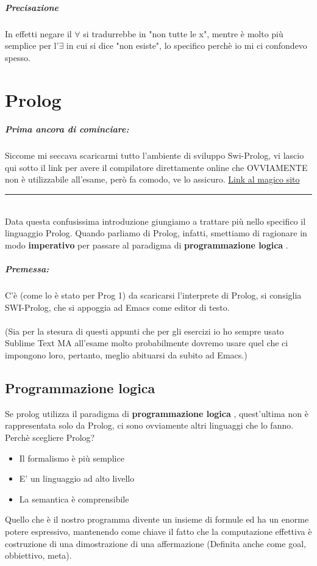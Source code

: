 \documentclass[12pt, a4paper, openany, oneside]{book}
\begin{document}
{\paragraph{Precisazione} In effetti negare il $\forall$ si tradurrebbe in 
"non tutte le x", mentre è molto più semplice per l'$\exists$ in cui si dice
"non esiste", lo specifico perchè io mi ci confondevo spesso.
\chapter{Prolog}
\paragraph{Prima ancora di cominciare: } Siccome mi seccava scaricarmi tutto 
l'ambiente di sviluppo Swi-Prolog, vi lascio qui sotto il link per avere il 
compilatore direttamente online che OVVIAMENTE non è utilizzabile all'esame, 
però fa comodo, ve lo assicuro. \href{https://swish.swi-prolog.org/}
{Link al magico sito}
\\
{\color{black} \rule{\linewidth}{0.3mm} }
\\ 
Data questa confusissima introduzione giungiamo a trattare più nello specifico
il linguaggio Prolog. Quando parliamo di Prolog, infatti, smettiamo di ragionare
in modo \color{red} \textbf{imperativo} \color{black} per passare al paradigma 
di \color{red} \textbf{programmazione logica} \color{black}.
\paragraph{Premessa: }C'è (come lo è stato per Prog 1) da scaricarsi l'interprete
di Prolog, si consiglia SWI-Prolog, che si appoggia ad Emacs come editor di testo.
\\ \\
(Sia per la stesura di questi appunti che per gli esercizi io ho sempre usato
Sublime Text MA all'esame molto probabilmente dovremo usare quel che ci impongono
loro, pertanto, meglio abituarsi da subito ad Emacs.)
\section{Programmazione logica}
Se prolog utilizza il paradigma di \color{red} \textbf{programmazione logica} 
\color{black}, quest'ultima non è rappresentata solo da Prolog, ci sono ovviamente
altri linguaggi che lo fanno. Perchè scegliere Prolog?
\begin{itemize}
	\item Il formalismo è più semplice
	\item E' un linguaggio ad alto livello
	\item La semantica è comprensibile
\end{itemize}
Quello che è il nostro programma divente un \color{red} insieme di formule
\color{black} ed ha un enorme potere espressivo, mantenendo come chiave il fatto
che la computazione effettiva è costruzione di una dimostrazione di una affermazione
(Definita anche come goal, obbiettivo, meta).
}
\end{document}
